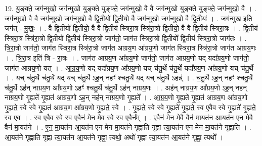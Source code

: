 \documentclass[17pt]{extarticle}
\begin{document}
19. यु॒ङ्क्ते॒ जग॑न्मुखो॒ जग॑न्मुखो युङ्क्ते युङ्क्ते॒ जग॑न्मुखो॒ वै वै जग॑न्मुखो युङ्क्ते युङ्क्ते॒ जग॑न्मुखो॒ वै । . जग॑न्मुखो॒ वै वै जग॑न्मुखो॒ जग॑न्मुखो॒ वै द्वि॒तीयो᳚ द्वि॒तीयो॒ वै जग॑न्मुखो॒ जग॑न्मुखो॒ वै द्वि॒तीयः॑ । . जग॑न्मुख॒ इति॒ जग॑त् - मु॒खः॒ । . वै द्वि॒तीयो᳚ द्वि॒तीयो॒ वै वै द्वि॒तीय॑ स्त्रिरा॒त्र स्त्रि॑रा॒त्रो द्वि॒तीयो॒ वै वै द्वि॒तीय॑ स्त्रिरा॒त्रः । . द्वि॒तीय॑ स्त्रिरा॒त्र स्त्रि॑रा॒त्रो द्वि॒तीयो᳚ द्वि॒तीय॑ स्त्रिरा॒त्रो जाग॑तो॒ जाग॑त स्त्रिरा॒त्रो द्वि॒तीयो᳚ द्वि॒तीय॑ स्त्रिरा॒त्रो जाग॑तः । . त्रि॒रा॒त्रो जाग॑तो॒ जाग॑त स्त्रिरा॒त्र स्त्रि॑रा॒त्रो जाग॑त आग्रय॒ण आ᳚ग्रय॒णो जाग॑त स्त्रिरा॒त्र स्त्रि॑रा॒त्रो 
जाग॑त आग्रय॒णः । . त्रि॒रा॒त्र इति॑ त्रि - रा॒त्रः । . जाग॑त आग्रय॒ण आ᳚ग्रय॒णो जाग॑तो॒ जाग॑त आग्रय॒णो यद् यदा᳚ग्रय॒णो जाग॑तो॒ जाग॑त आग्रय॒णो यत् । . आ॒ग्र॒य॒णो यद् यदा᳚ग्रय॒ण आ᳚ग्रय॒णो यच् च॑तु॒र्थे च॑तु॒र्थे यदा᳚ग्रय॒ण आ᳚ग्रय॒णो यच् च॑तु॒र्थे । . यच् च॑तु॒र्थे च॑तु॒र्थे यद् यच् च॑तु॒र्थे ऽह॒न् नहꣳ॑ श्चतु॒र्थे यद् यच् च॑तु॒र्थे ऽहन्न्॑ । . च॒तु॒र्थे ऽह॒न् नहꣳ॑ श्चतु॒र्थे च॑तु॒र्थे ऽह॑न् नाग्रय॒ण आ᳚ग्रय॒णो ऽहꣳ॑ श्चतु॒र्थे च॑तु॒र्थे ऽह॑न् नाग्रय॒णः । . अह॑न् नाग्रय॒ण आ᳚ग्रय॒णो ऽह॒न् नह॑न् नाग्रय॒णो गृ॒ह्यते॑ गृ॒ह्यत॑ आग्रय॒णो ऽह॒न् नह॑न् नाग्रय॒णो गृ॒ह्यते᳚ । . आ॒ग्र॒य॒णो गृ॒ह्यते॑ गृ॒ह्यत॑ आग्रय॒ण आ᳚ग्रय॒णो गृ॒ह्यते॒ स्वे स्वे गृ॒ह्यत॑ आग्रय॒ण आ᳚ग्रय॒णो गृ॒ह्यते॒ स्वे । . गृ॒ह्यते॒ स्वे स्वे गृ॒ह्यते॑ गृ॒ह्यते॒ स्व ए॒वैव स्वे गृ॒ह्यते॑ गृ॒ह्यते॒ स्व ए॒व । . स्व ए॒वैव स्वे स्व ए॒वैन॑ मेन मे॒व स्वे स्व ए॒वैन᳚म् । . ए॒वैन॑ मेन मे॒वै वैन॑ मा॒यत॑न आ॒यत॑न एन मे॒वै वैन॑ मा॒यत॑ने । . ए॒न॒ मा॒यत॑न आ॒यत॑न एन मेन मा॒यत॑ने गृह्णाति गृह्णा त्या॒यत॑न एन मेन मा॒यत॑ने गृह्णाति । . आ॒यत॑ने गृह्णाति गृह्णा त्या॒यत॑न आ॒यत॑ने गृह्णा॒ त्यथो॒ अथो॑ गृह्णा त्या॒यत॑न आ॒यत॑ने गृह्णा॒ त्यथो᳚ । \newline
\end{document}
